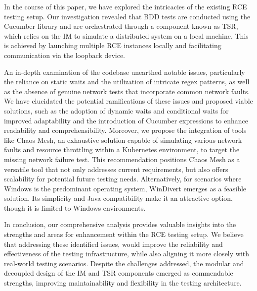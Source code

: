 \label{sec:conclusion}
In the course of this paper, we have explored the intricacies of the existing RCE testing setup. Our investigation revealed that \acf{BDD} tests are conducted using the Cucumber library and are orchestrated through a component known as \acf{TSR}, which relies on the \acf{IM} to simulate a distributed system on a local machine. This is achieved by launching multiple RCE instances locally and facilitating communication via the loopback device. 

An in-depth examination of the codebase unearthed notable issues, particularly the reliance on static waits and the utilization of intricate regex patterns, as well as the absence of genuine network tests that incorporate common network faults. We have elucidated the potential ramifications of these issues and proposed viable solutions, such as the adoption of dynamic waits and conditional waits for improved adaptability and the introduction of Cucumber expressions to enhance readability and comprehensibility. Moreover, we propose the integration of tools like Chaos Mesh, an exhaustive solution capable of simulating various network faults and resource throttling within a Kubernetes environment, to target the missing network failure test. This recommendation positions Chaos Mesh as a versatile tool that not only addresses current requirements, but also offers scalability for potential future testing needs. Alternatively, for scenarios where Windows is the predominant operating system, WinDivert emerges as a feasible solution. Its simplicity and Java compatibility make it an attractive option, though it is limited to Windows environments. 

In conclusion, our comprehensive analysis provides valuable insights into the strengths and areas for enhancement within the RCE testing setup. We believe that addressing these identified issues, would improve the reliability and effectiveness of the testing infrastructure, while also aligning it more closely with real-world testing scenarios. Despite the challenges addressed, the modular and decoupled design of the \ac{IM} and \ac{TSR} components emerged as commendable strengths, improving maintainability and flexibility in the testing architecture.

